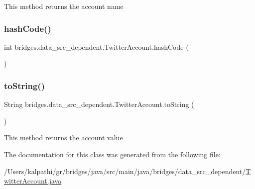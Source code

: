 This method returns the account name \mbox{\label{classbridges_1_1data__src__dependent_1_1_twitter_account_a2f89f6f336b1bd39f0cf3aa444c76885}} 
\subsubsection{\texorpdfstring{hashCode()}{hashCode()}}
{\footnotesize\ttfamily int bridges.\+data\+\_\+src\+\_\+dependent.\+Twitter\+Account.\+hash\+Code (\begin{DoxyParamCaption}{ }\end{DoxyParamCaption})}

\mbox{\label{classbridges_1_1data__src__dependent_1_1_twitter_account_af4dd5dfe1a1556fa57f917fb24d8d6f2}} 
\subsubsection{\texorpdfstring{toString()}{toString()}}
{\footnotesize\ttfamily String bridges.\+data\+\_\+src\+\_\+dependent.\+Twitter\+Account.\+to\+String (\begin{DoxyParamCaption}{ }\end{DoxyParamCaption})}

This method returns the account value 

The documentation for this class was generated from the following file\+:\begin{DoxyCompactItemize}
\item 
/\+Users/kalpathi/gr/bridges/java/src/main/java/bridges/data\+\_\+src\+\_\+dependent/\mbox{\hyperlink{_twitter_account_8java}{Twitter\+Account.\+java}}\end{DoxyCompactItemize}
